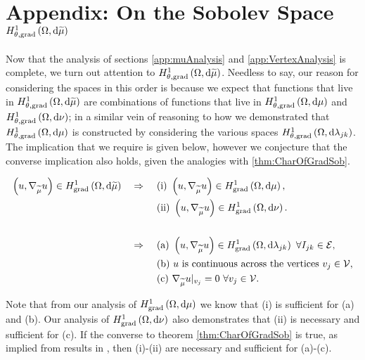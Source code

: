 \section{Appendix: On the Sobolev Space $H^1_{\theta, \mathrm{grad}}\left( \Omega, \mathrm{d}\widetilde{\mu} \right)$} \label{app:SumMeasureAnalysis}
Now that the analysis of sections \ref{app:muAnalysis} and \ref{app:VertexAnalysis} is complete, we turn out attention to $H^1_{\theta, \mathrm{grad}}\left( \Omega, \mathrm{d}\widetilde{\mu} \right)$.
Needless to say, our reason for considering the spaces in this order is because we expect that functions that live in $H^1_{\theta, \mathrm{grad}}\left( \Omega, \mathrm{d}\widetilde{\mu} \right)$ are combinations of functions that live in $H^1_{\theta, \mathrm{grad}}\left( \Omega, \mathrm{d}\mu \right)$ and $H^1_{\theta, \mathrm{grad}}\left( \Omega, \mathrm{d}\nu \right)$; in a similar vein of reasoning to how we demonstrated that $H^1_{\theta, \mathrm{grad}}\left( \Omega, \mathrm{d}\mu \right)$ is constructed by considering the various spaces $H^1_{\theta, \mathrm{grad}}\left( \Omega, \mathrm{d}\lambda_{jk} \right)$.
The implication that we require is given below, however we conjecture that the converse implication also holds, given the analogies with \ref{thm:CharOfGradSob}.
\begin{theorem} \label{thm:ThickVertexSpaceCharacterisation}
	\begin{align*}
		\left( u, \nabla_{\widetilde{\mu}}u \right)\in H^1_\mathrm{grad}\left( \Omega, \mathrm{d}\widetilde{\mu} \right) \quad\Rightarrow\quad
		& \ \text{(i)} \ \left( u, \nabla_{\widetilde{\mu}}u \right)\in H^1_\mathrm{grad}\left( \Omega, \mathrm{d}\mu \right), \\
		& \ \text{(ii)} \ \left( u, \nabla_{\widetilde{\mu}}u \right)\in H^1_\mathrm{grad}\left( \Omega, \mathrm{d}\nu \right). \\
		\\
		\quad\Rightarrow\quad
		& \ \text{(a)} \ \left( u, \nabla_{\widetilde{\mu}}u \right)\in H^1_\mathrm{grad}\left( \Omega, \mathrm{d}\lambda_{jk} \right) \ \forall I_{jk}\in\mathcal{E}, \\
		& \ \text{(b)} \ u \text{ is continuous across the vertices} \ v_j\in\mathcal{V}, \\
		& \ \text{(c)} \ \nabla_{\widetilde{\mu}}u\vert_{v_j} = 0 \ \forall v_j\in\mathcal{V}.
	\end{align*}
\end{theorem}
Note that from our analysis of $H^1_\mathrm{grad}\left( \Omega, \mathrm{d}\mu \right)$ we know that (i) is sufficient for (a) and (b).
Our analysis of $H^1_\mathrm{grad}\left( \Omega, \mathrm{d}\nu \right)$ also demonstrates that (ii) is necessary and sufficient for (c).
If the converse to theorem \ref{thm:CharOfGradSob} is true, as implied from results in \cite{zhikov2002homogenization}, then (i)-(ii) are necessary and sufficient for (a)-(c).

